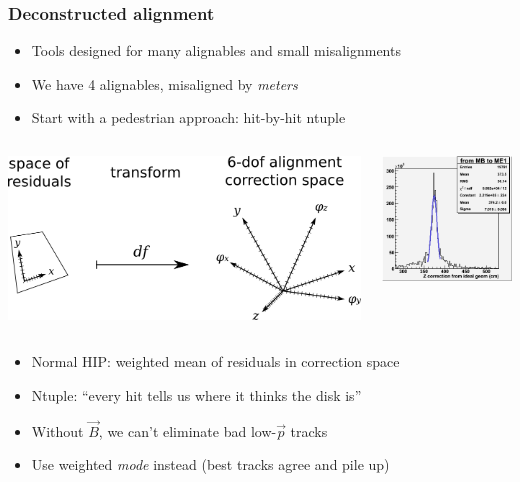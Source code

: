 \documentclass[compress]{beamer}
\begin{document}
\begin{frame}
\frametitle{Deconstructed alignment}

\begin{itemize}
\item Tools designed for many alignables and small misalignments
\item We have 4 alignables, misaligned by {\it meters}
\item Start with a pedestrian approach: hit-by-hit ntuple
\end{itemize}

\begin{columns}
\includegraphics[width=\linewidth]{transformation.png}

\includegraphics[width=\linewidth]{hist_0and1.png}
\end{columns}

\begin{itemize}
\item Normal HIP: weighted mean of residuals in correction space
\item Ntuple: ``every hit tells us where it thinks the disk is''
\item Without $\vec{B}$, we can't eliminate bad low-$\vec{p}$ tracks
\item Use weighted {\it mode} instead (best tracks agree and pile up)
\end{itemize}
\end{frame}
\end{document}

